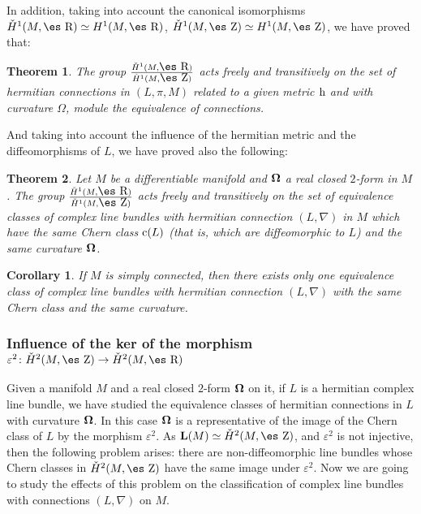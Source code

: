 \documentclass[12pt]{article}
\theoremstyle{plain}
\newtheorem{teor}{Theorem}
\newtheorem{corol}{Corollary}
\def\dst{\(}
\def\h{{\rm h}}
\def\curv{{\bf \Omega}}
\def\Zahl{\mbox{\es Z}}
\def\Real{\mbox{\es R}}
\begin{document}
In addition, taking into account the canonical isomorphisms
$\check H^1(M,\Real ) \simeq H^1(M,\Real )$,
$\check H^1(M,\Zahl ) \simeq H^1(M,\Zahl )$,
we have proved that:

\begin{teor}
The group
\dst\frac{\check H^1(M,\Real )}{\check H^1(M,\Zahl )}\)
acts freely and transitively on the set of hermitian connections in
$(L,\pi ,M)$ related to a given metric $\h$
and with curvature $\Omega$, module the equivalence of connections.
\end{teor}

And taking into account the influence of the hermitian metric
and the diffeomorphisms of $L$,
we have proved also the following:

\begin{teor}
Let $M$ be a differentiable manifold and
$\curv$ a real closed $2$-form in $M$. The group
\dst\frac{\check H^1(M,\Real )}{\check H^1(M,\Zahl )}\)
acts freely and transitively on the set of equivalence classes
of complex line bundles with hermitian connection
$(L,\nabla )$ in $M$
which have the same Chern class ${\rm c}(L)$
(that is, which are diffeomorphic to $L$)
and the same curvature $\curv$.
\end{teor}

\begin{corol}
If $M$ is simply connected,
then there exists only one equivalence class
of complex line bundles with hermitian connection $(L,\nabla )$
with the same Chern class and the same curvature.
\end{corol}


\subsubsection{Influence of the ker of the morphism
$\varepsilon^2 \colon \check H^2(M,\Zahl ) \to \check H^2(M,\Real )$}


Given a manifold $M$ and a real closed $2$-form $\curv$ on it,
if $L$ is a hermitian complex line bundle, we have studied
the equivalence classes of hermitian connections in $L$
with curvature $\curv$. In this case $\curv$
is a representative of the image of the Chern class
of $L$ by the morphism $\varepsilon^2$.
As ${\bf L}(M) \simeq \check H^2(M,\Zahl )$,
and $\varepsilon^2$ is not injective,
then the following problem arises:
there are non-diffeomorphic line bundles whose Chern classes
in $\check H^2(M,\Zahl )$ have the same image under $\varepsilon^2$.
Now we are going to study the effects of this problem
on the classification of complex line bundles
with connections $(L,\nabla )$ on $M$.
\end{document}
